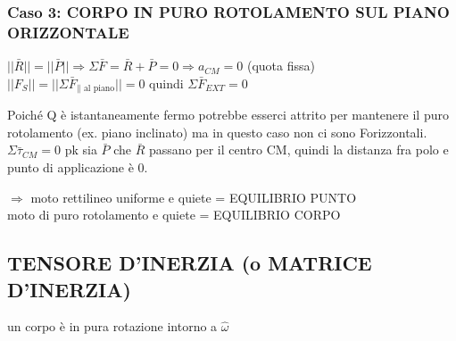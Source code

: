 \subsubsection*{Caso 3: CORPO IN PURO ROTOLAMENTO SUL PIANO ORIZZONTALE}
\begin{figure}[H]
\raggedleft
{}
\end{figure}

$||\bar{R}|| = ||\bar{P}|| \Rightarrow \Sigma \bar{F} = \bar{R} + \bar{P} = 0 \Rightarrow a_{CM} = 0$ (quota fissa)
$||F_{S}|| = ||\Sigma \bar{F}_{\parallel \text{ al piano}}|| = 0$ quindi $\Sigma \bar{F}_{EXT} = 0$ \checkmark

Poiché Q è istantaneamente fermo potrebbe esserci attrito per mantenere il puro rotolamento (ex. piano inclinato) ma in questo caso non ci sono Forizzontali.
$\Sigma \bar{\tau}_{CM} = 0$ pk sia $\bar{P}$ che $\bar{R}$ passano per il centro CM, quindi la distanza fra polo e punto di applicazione è 0.

$\Rightarrow$ moto rettilineo uniforme e quiete = EQUILIBRIO PUNTO \\
moto di puro rotolamento e quiete = EQUILIBRIO CORPO

\subsection*{TENSORE D'INERZIA (o MATRICE D'INERZIA)}
un corpo è in pura rotazione intorno a $\hat{\omega}$
\begin{figure}[H]
\raggedleft
{}
\end{figure}

